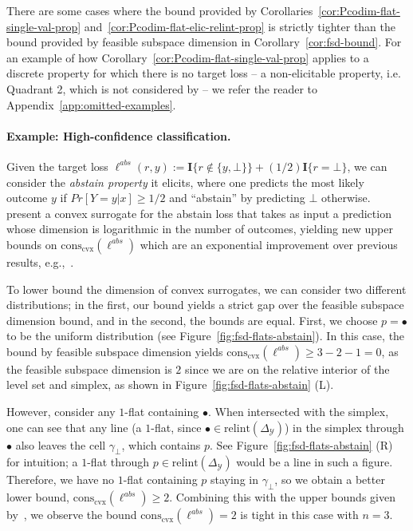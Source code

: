 \documentclass[anon,12pt]{colt2021} %
\newcommand{\Comments}{1}
\newcommand{\mytodo}[2]{\ifnum\Comments=1%
	\todo[linecolor=#1!80!black,backgroundcolor=#1,bordercolor=#1!80!black]{#2}\fi}
\newcommand{\raft}[1]{\mytodo{green!20!white}{RF: #1}}
\newcommand{\jessiet}[1]{\mytodo{purple!20!white}{JF: #1}}
\newcommand{\simplex}{\Delta_\Y}
\newcommand{\relint}[1]{\mathrm{relint}(#1)}
\newcommand{\conscvx}{\mathrm{cons}_\mathrm{cvx}}
\newcommand{\Y}{\mathcal{Y}}
\newcommand{\Ind}[1]{\mathbf{I}\{{#1}\}}
\begin{document}
There are some cases where the bound provided by Corollaries~\ref{cor:Pcodim-flat-single-val-prop} and~\ref{cor:Pcodim-flat-elic-relint-prop} is strictly tighter than the bound provided by feasible subspace dimension in Corollary~\ref{cor:fsd-bound}.
For an example of how Corollary~\ref{cor:Pcodim-flat-single-val-prop} applies to a discrete property for which there is no target loss -- a non-elicitable property, i.e. Quadrant 2, which is not considered by \citet{ramaswamy2018consistent} -- we refer the reader to Appendix~\ref{app:omitted-examples}.

\paragraph{Example: High-confidence classification.}\label{subsec:examples-finite}
Given the target loss $\ell^{abs}(r,y) := \Ind{r \not \in \{y, \bot\}} + (1/2)\Ind{r = \bot}$,  we can consider the \emph{abstain property} it elicits, where one predicts the most likely outcome $y$ if $Pr[Y=y|x] \geq 1/2$ and ``abstain'' by predicting $\bot$ otherwise.
\citet{ramaswamy2016convex} present a convex surrogate for the abstain loss that takes as input a prediction whose dimension is logarithmic in the number of outcomes, yielding new upper bounds on $\conscvx(\ell^{abs})$ which are an exponential improvement over previous results, e.g.,~\cite{crammer2001algorithmic}.

To lower bound the dimension of convex surrogates, we can consider two different distributions; in the first, our bound yields a strict gap over the feasible subspace dimension bound, and in the second, the bounds are equal.
First, we choose $p = \bullet$ to be the uniform distribution (see Figure~\ref{fig:fsd-flats-abstain}).
In this case, the bound by feasible subspace dimension yields $\conscvx(\ell^{abs}) \geq 3 - 2 - 1 = 0$, as the feasible subspace dimension is $2$ since we are on the relative interior of the level set and simplex, as shown in Figure~\ref{fig:fsd-flats-abstain} (L).


However, consider any $1$-flat containing $\bullet$.
When intersected with the simplex, one can see that any line (a $1$-flat, since $\bullet \in \relint{\simplex}$) in the simplex through $\bullet$ also leaves the cell $\gamma_\bot$, which contains $p$.
See Figure~\ref{fig:fsd-flats-abstain} (R) for intuition; a $1$-flat through $p \in \relint{\simplex}$ would be a line in such a figure.
Therefore, we have no $1$-flat containing $p$ staying in $\gamma_\bot$, so we obtain a better lower bound, $\conscvx(\ell^{abs}) \geq 2$.
Combining this with the upper bounds given by~\cite{ramaswamy2018consistent}, we observe the bound $\conscvx(\ell^{abs}) = 2$ is tight in this case with $n=3$.
\end{document}
